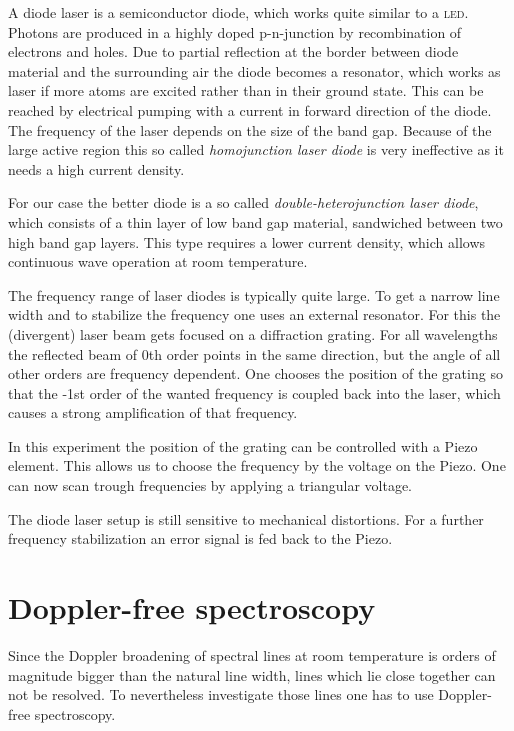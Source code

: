 \documentclass[11pt, english, fleqn, DIV=15, headinclude, BCOR=2cm]{scrreprt}
\begin{document}
A diode laser is a semiconductor diode, which works quite similar to a
\textsc{led}. Photons are produced in a highly doped p-n-junction by
recombination of electrons and holes. Due to partial reflection at the border
between diode material and the surrounding air the diode becomes a resonator,
which works as laser if more atoms are excited rather than in their ground
state. This can be reached by electrical pumping with a current in forward
direction of the diode. The frequency of the laser depends on the size of the
band gap.  Because of the large active region this so called \emph{homojunction
laser diode} is very ineffective as it needs a high current density.

For our case the better diode is a so called \emph{double-heterojunction laser
diode}, which consists of a thin layer of low band gap material, sandwiched
between two high band gap layers. This type requires a lower current
density, which allows continuous wave operation at room temperature. 

The frequency range of laser diodes is typically quite large. To get a narrow
line width and to stabilize the frequency one uses an external resonator. For
this the (divergent) laser beam gets focused on a diffraction grating. For all
wavelengths the reflected beam of 0th order points in the same direction, but
the angle of all other orders are frequency dependent. One chooses the position
of the grating so that the -1st order of the wanted frequency is coupled back
into the laser, which causes a strong amplification of that frequency. 

In this experiment the position of the grating can be controlled with a Piezo
element. This allows us to choose the frequency by the voltage on the Piezo.
One can now scan trough frequencies by applying a triangular voltage.

The diode laser setup is still sensitive to mechanical distortions. For a
further frequency stabilization an error signal is fed back to the Piezo.

\section{Doppler-free spectroscopy}

Since the Doppler broadening of spectral lines at room temperature is orders of
magnitude bigger than the natural line width, lines which lie close together can
not be resolved. To nevertheless investigate those lines one has to use
Doppler-free spectroscopy.
\end{document}
